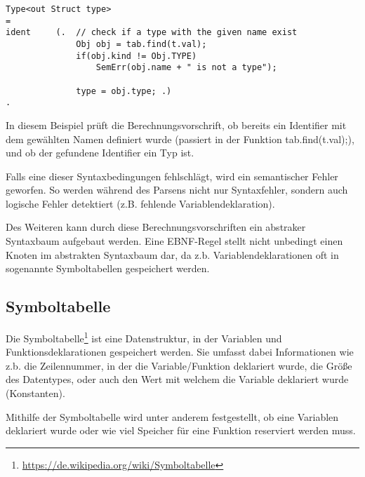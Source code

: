 
\begin{lstlisting}[language=EBNF]
Type<out Struct type>
= 
ident     (.  // check if a type with the given name exist
              Obj obj = tab.find(t.val);
              if(obj.kind != Obj.TYPE)
                  SemErr(obj.name + " is not a type");

              type = obj.type; .)
. 
\end{lstlisting}

In diesem Beispiel pr\"uft die Berechnungsvorschrift, ob bereits ein Identifier mit dem gew\"ahlten Namen definiert wurde (passiert in der Funktion tab.find(t.val);), und ob der gefundene Identifier ein Typ ist. 

Falls eine dieser Syntaxbedingungen fehlschl\"agt, wird ein semantischer Fehler geworfen. So werden w\"ahrend des Parsens nicht nur Syntaxfehler, sondern auch logische Fehler detektiert (z.B. fehlende Variablendeklaration).

Des Weiteren kann durch diese Berechnungsvorschriften ein abstraker Syntaxbaum aufgebaut werden. Eine EBNF-Regel stellt nicht unbedingt einen Knoten im abstrakten Syntaxbaum dar, da z.b. Variablendeklarationen oft in sogenannte Symboltabellen gespeichert werden.

\subsection{Symboltabelle}
\label{sec:comp-symbtab}

Die Symboltabelle\footnote{\url{https://de.wikipedia.org/wiki/Symboltabelle}} ist eine Datenstruktur, in der Variablen und Funktionsdeklarationen gespeichert werden. Sie umfasst dabei Informationen wie z.b. die Zeilennummer, in der die Variable/Funktion deklariert wurde, die Gr\"o\ss{}e des Datentypes, oder auch den Wert mit welchem die Variable deklariert wurde (Konstanten).

Mithilfe der Symboltabelle wird unter anderem festgestellt, ob eine Variablen deklariert wurde oder wie viel Speicher f\"ur eine Funktion reserviert werden muss.


